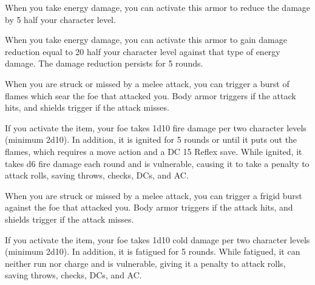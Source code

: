 
 When you take energy damage, you can activate this armor to reduce the damage by 5 \add half your character level.


 When you take energy damage, you can activate this armor to gain damage reduction equal to 20 \add half your character level against that type of energy damage. The damage reduction persists for 5 rounds.


 When you are struck or missed by a melee attack, you can trigger a burst of flames which sear the foe that attacked you. Body armor triggers if the attack hits, and shields trigger if the attack misses.

If you activate the item, your foe takes 1d10 fire damage per two character levels (minimum 2d10). In addition, it is ignited for 5 rounds or until it puts out the flames, which requires a move action and a DC 15 Reflex save. While ignited, it takes d6 fire damage each round and is vulnerable, causing it to take a  penalty to attack rolls, saving throws, checks, DCs, and AC.


 When you are struck or missed by a melee attack, you can trigger a frigid burst against the foe that attacked you. Body armor triggers if the attack hits, and shields trigger if the attack misses.

If you activate the item, your foe takes 1d10 cold damage per two character levels (minimum 2d10). In addition, it is fatigued for 5 rounds. While fatigued, it can neither run nor charge and is vulnerable, giving it a  penalty to attack rolls, saving throws, checks, DCs, and AC.



